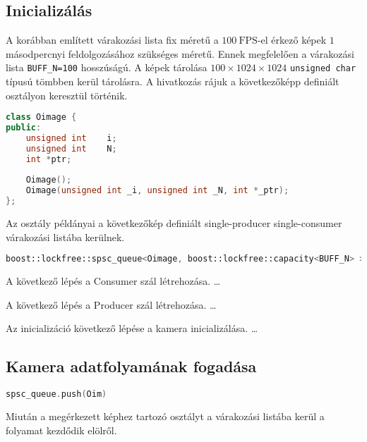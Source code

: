 	\subsection*{Inicializálás}
	A korábban említett várakozási lista fix méretű a $100\ \mathrm{FPS}$-el érkező képek $1$ másodpercnyi feldolgozásához szükséges
	méretű. Ennek megfelelően a várakozási lista \texttt{BUFF\_N=100} hosszúságú. A képek tárolása $100
	\times 1024 \times 1024$ \texttt{unsigned char} típusú tömbben kerül tárolásra. A hivatkozás rájuk a következőképp definiált osztályon keresztül történik.
\begin{lstlisting}[language=C++]
class Oimage {
public:
	unsigned int	i;
	unsigned int	N;
	int	*ptr;
	
	Oimage();
	Oimage(unsigned int _i, unsigned int _N, int *_ptr);
};
\end{lstlisting}
	
	Az osztály példányai a következőkép definiált single-producer single-consumer várakozási listába kerülnek.
	 
\begin{lstlisting}[language=C++]
boost::lockfree::spsc_queue<Oimage, boost::lockfree::capacity<BUFF_N> > spsc_queue;
\end{lstlisting}
	
	A következő lépés a Consumer szál létrehozása. \ldots
	
	A következő lépés a Producer szál létrehozása. \ldots
	
	Az inicializáció következő lépése a kamera inicializálása. \ldots
	 
	\subsection*{Kamera adatfolyamának fogadása}
	
\begin{lstlisting}[language=C++]
spsc_queue.push(Oim)
\end{lstlisting}

	Miután a megérkezett képhez tartozó osztályt a várakozási listába kerül a folyamat kezdődik elölről.
	
